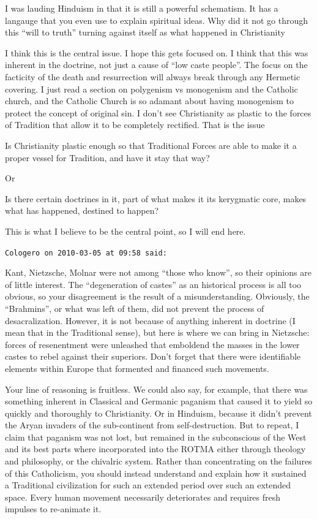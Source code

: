 \begin{footnotesize}
\begin{sffamily}
I was lauding Hinduism in that it is still a powerful schematism. It has a langauge that you even use to explain spiritual ideas. Why did it not go through this ``will to truth'' turning against itself as what happened in Christianity

I think this is the central issue. I hope this gets focused on. I think that this was inherent in the doctrine, not just a cause of ``low caste people''. The focus on the facticity of the death and resurrection will always break through any Hermetic covering. I just read a section on polygenism vs monogenism and the Catholic church, and the Catholic Church is so adamant about having monogenism to protect the concept of original sin. I don't see Christianity as plastic to the forces of Tradition that allow it to be completely rectified. That is the issue

Is Christianity plastic enough so that Traditional Forces are able to make it a proper vessel for Tradition, and have it stay that way?

Or

Is there certain doctrines in it, part of what makes it its kerygmatic core, makes what has happened, destined to happen?

This is what I believe to be the central point, so I will end here.

\hfill

\texttt{Cologero on 2010-03-05 at 09:58 said:}

Kant, Nietzsche, Molnar were not among ``those who know'', so their opinions are of little interest. The ``degeneration of castes'' as an historical process is all too obvious, so your disagreement is the result of a misunderstanding. Obviously, the ``Brahmins'', or what was left of them, did not prevent the process of desacralization. However, it is not because of anything inherent in doctrine (I mean that in the Traditional sense), but here is where we can bring in Nietzsche: forces of resenentment were unleashed that emboldend the masses in the lower castes to rebel against their superiors. Don't forget that there were identifiable elements within Europe that formented and financed such movements.

Your line of reasoning is fruitless. We could also say, for example, that there was something inherent in Classical and Germanic paganism that caused it to yield so quickly and thoroughly to Christianity. Or in Hinduism, because it didn't prevent the Aryan invaders of the sub-continent from self-destruction. But to repeat, I claim that paganism was not lost, but remained in the subconscious of the West and its best parts where incorporated into the ROTMA either through theology and philosophy, or the chivalric system. Rather than concentrating on the failures of this Catholicism, you should instead understand and explain how it sustained a Traditional civilization for such an extended period over such an extended space. Every human movement necessarily deteriorates and requires fresh impulses to re-animate it.


\end{sffamily}
\end{footnotesize}

